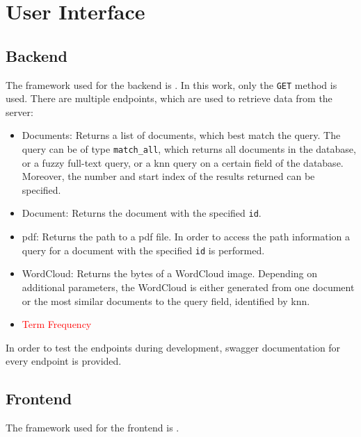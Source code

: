 \section{User Interface}\label{sec:ui}

\subsection{Backend}\label{subsec:backend}

The framework used for the backend is \flask{}.
In this work, only the \texttt{GET} method is used.
There are multiple endpoints, which are used to retrieve data from the server:

\begin{itemize}
    \item \label{pt:docs}Documents: 
        Returns a list of documents, which best match the query.
        The query can be of type \texttt{match\_all}, which returns all documents in the database, 
        or a fuzzy full-text query, 
        or a \ac{knn} query on a certain field of the database.
        Moreover, the number and start index of the results returned can be specified.

    \item \label{pt:doc}Document: 
        Returns the document with the specified \texttt{id}.

    \item \label{pt:pdf}\ac{pdf}: 
        Returns the path to a \ac{pdf} file.
        In order to access the path information a query for a document with the specified \texttt{id} is performed.
    
    \item \label{pt:wordcloud}WordCloud: 
        Returns the bytes of a WordCloud image. 
        Depending on additional parameters, the WordCloud is either generated from one document or 
        the most similar documents to the query field, identified by \ac{knn}.

    \item \label{pt:termfrequency}\textcolor{red}{Term Frequency}
\end{itemize}

In order to test the endpoints during development, swagger documentation for every endpoint is provided.





\subsection{Frontend}\label{subsec:frontend}

The framework used for the frontend is \angular{}.